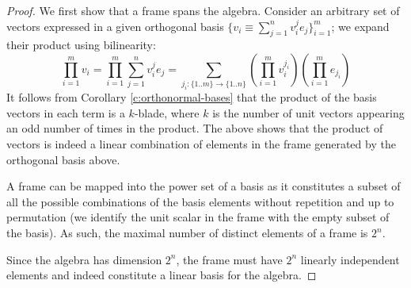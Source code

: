 \begin{proof}
	We first show that a frame spans the algebra. Consider an arbitrary set of vectors expressed in a given orthogonal basis $\{v_i \equiv \sum_{j=1}^n v_i^je_j\}_{i=1}^m$; we expand their product using bilinearity:
	\[\prod_{i=1}^m v_i = \prod_{i=1}^m \sum_{j=1}^n v_i^j e_j = \sum_{j_i : \{1..m\} \to \{1..n\}} \left(\prod_{i=1}^m v_i^{j_i}\right) \left(\prod_{i=1}^m e_{j_i}\right)\]
	It follows from Corollary \ref{c:orthonormal-bases} that the product of the basis vectors in each term is a $k$-blade, where $k$ is the number of unit vectors appearing an odd number of times in the product. The above shows that the product of vectors is indeed a linear combination of elements in the frame generated by the orthogonal basis above.

	A frame can be mapped into the power set of a basis as it constitutes a subset of all the possible combinations of the basis elements without repetition and up to permutation (we identify the unit scalar in the frame with the empty subset of the basis). As such, the maximal number of distinct elements of a frame is $2^n$.

	Since the algebra has dimension $2^n$, the frame must have $2^n$ linearly independent elements and indeed constitute a linear basis for the algebra.
\end{proof}
